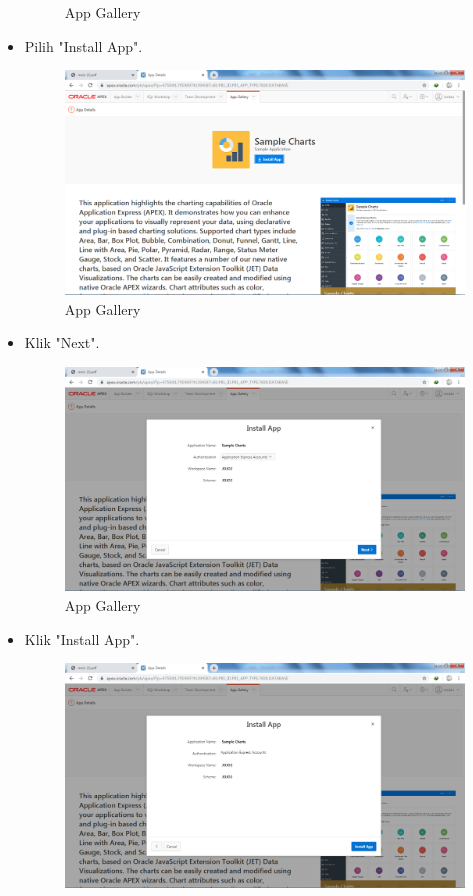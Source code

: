\documentclass[12pt, times new roman]{article}
\begin{document}
\begin{itemize}
\begin{figure}[!htpb]
	\caption{App Gallery}
\end{figure}
\item Pilih "Install App".
\begin{figure}[!htpb]
	\centering
	\includegraphics[width=12.5cm]{figures/Screenshot_27.png}
	\caption{App Gallery}
\end{figure}
\item Klik "Next".
\begin{figure}[!htpb]
	\centering
	\includegraphics[width=12.5cm]{figures/Screenshot_28.png}
	\caption{App Gallery}
\end{figure}
\item Klik "Install App".
\begin{figure}[!htpb]
	\centering
	\includegraphics[width=12.5cm]{figures/Screenshot_29.png}

\end{figure}
\end{itemize}
\end{document}
